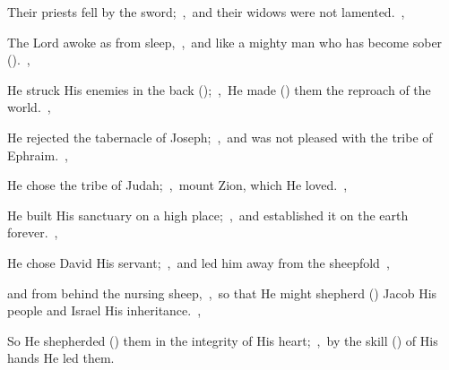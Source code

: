 \documentclass[12pt,twoside,a5paper]{article}
\begin{document}
\begin{normalparskip}
  Their priests fell by the sword;~\sep\ and their widows were not lamented.~\sep

  The Lord awoke as from sleep,~\sep\ and like a mighty man who has become sober ().~\sep

  He struck His enemies in the back ();~\sep\ He made () them the reproach of the world.~\sep

  He rejected the tabernacle of Joseph;~\sep\ and was not pleased with the tribe of Ephraim.~\sep

  He chose the tribe of Judah;~\sep\ mount Zion, which He loved.~\sep

  He built His sanctuary on a high place;~\sep\ and established it on the earth forever.~\sep

  He chose David His servant;~\sep\ and led him away from the sheepfold~\sep

  and from behind the nursing sheep,~\sep\ so that He might shepherd () Jacob His people and Israel His inheritance.~\sep

  So He shepherded () them in the integrity of His heart;~\sep\ by the skill () of His hands He led them.
\end{normalparskip}



\end{document}
